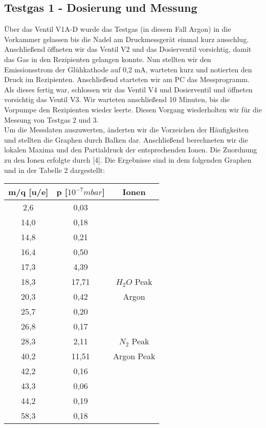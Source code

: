 \subsection{Testgas 1 - Dosierung und Messung}
Über das Ventil V1A-D wurde das Testgas (in diesem Fall Argon) in die Vorkammer gelassen bis die Nadel am Druckmessgerät einmal kurz ausschlug. Anschließend öffneten wir das Ventil V2 und das Dosierventil vorsichtig, damit das Gas in den Rezipienten gelangen konnte. Nun stellten wir den Emissionsstrom der Glühkathode auf 0,2 mA, warteten kurz und notierten den Druck im Rezipienten. Anschließend starteten wir am PC das Messprogramm. Als dieses fertig war, schlossen wir das Ventil V4 und Dosierventil und öffneten vorsichtig das Ventil V3. Wir warteten anschließend 10 Minuten, bis die Vorpumpe den Rezipienten wieder leerte. Diesen Vorgang wiederholten wir für die Messung von Testgas 2 und 3.\\
Um die Messdaten auszuwerten, änderten wir die Vorzeichen der Häufigkeiten und stellten die Graphen durch Balken dar. Anschließend berechneten wir die lokalen Maxima und den Partialdruck der entsprechenden Ionen. Die Zuordnung zu den Ionen erfolgte durch [4]. Die Ergebnisse sind in dem folgenden Graphen und in der Tabelle 2 dargestellt:\\


\begin{center}
\begin{tabular}{c|c|c}
m/q [u/e] & p [$10^{-7} mbar$] & Ionen\\	
\hline	
2,6 & 0,03	&\\	
14,0 & 0,18	&\\	
14,8 & 0,21	&\\	
16,4 & 0,50	&\\	
17,3 & 4,39	&\\	
18,3 & 17,71 & $H_2O$ Peak\\
20,3 & 0,42	& Argon\\
25,7 & 0,20	&\\
26,8 & 0,17	&\\
28,3 & 2,11	& $N_2$ Peak\\
40,2 & 11,51 & Argon Peak\\
42,2 & 0,16	&\\
43,3 & 0,06	&\\
44,2 & 0,19	&\\
58,3 & 0,18	&\\
\end{tabular}
\end{center}


